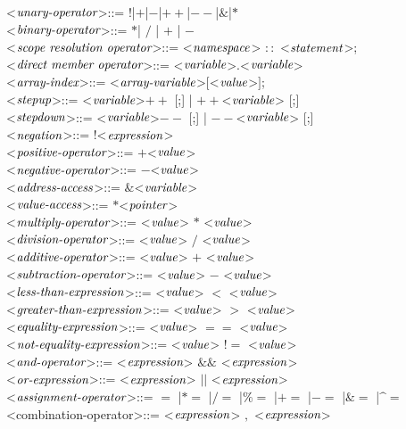 \documentclass[11pt, a4paper, UTF8]{ctexart}
\begin{document}
\begin{solution}
<$\emph{unary-operator}$>::=  $\boldsymbol{!}$|$\boldsymbol{+}$|$\boldsymbol{-}$|$\boldsymbol{++}$|$\boldsymbol{--}$|$\boldsymbol{\&}$|$\boldsymbol{*}$\\
<$\emph{binary-operator}$>::=  $\boldsymbol{*}$| $\boldsymbol{/}$ | $\boldsymbol{+}$ | $\boldsymbol{-}$ \\
<$\emph{scope resolution operator}$>::=  <$\emph{namespace}$> $\boldsymbol{::}$ <$\emph{statement}$>;\\
<$\emph{direct member operator}$>::=  <$\emph{variable}$>$\boldsymbol{.}$<$\emph{variable}$>\\
<$\emph{array-index}$>::=  <$\emph{array-variable}$>$\boldsymbol{[}$<$\emph{value}$>$\boldsymbol{]}$;\\
<$\emph{stepup}$>::=  <$\emph{variable}$>$\boldsymbol{++}$ [;] | $\boldsymbol{++}$<$\emph{variable}$> [;]\\
<$\emph{stepdown}$>::=  <$\emph{variable}$>$\boldsymbol{--}$ [;] | $\boldsymbol{--}$<$\emph{variable}$> [;]\\
<$\emph{negation}$>::=  $\boldsymbol{!}$<$\emph{expression}$>\\
<$\emph{positive-operator}$>::=  $\boldsymbol{+}$<$\emph{value}$>\\
<$\emph{negative-operator}$>::=  $\boldsymbol{-}$<$\emph{value}$>\\
<$\emph{address-access}$>::=  $\boldsymbol{\&}$<$\emph{variable}$>\\
<$\emph{value-access}$>::=  $\boldsymbol{*}$<$\emph{pointer}$>\\
<$\emph{multiply-operator}$>::=  <$\emph{value}$> $\boldsymbol{*}$ <$\emph{value}$>\\
<$\emph{division-operator}$>::=  <$\emph{value}$> $\boldsymbol{/}$ <$\emph{value}$>\\
<$\emph{additive-operator}$>::=  <$\emph{value}$> $\boldsymbol{+}$ <$\emph{value}$>\\
<$\emph{subtraction-operator}$>::=  <$\emph{value}$> $\boldsymbol{-}$ <$\emph{value}$>\\
<$\emph{less-than-expression}$>::=  <$\emph{value}$> $\boldsymbol{<}$ <$\emph{value}$>\\
<$\emph{greater-than-expression}$>::=  <$\emph{value}$> $\boldsymbol{>}$ <$\emph{value}$>\\
<$\emph{equality-expression}$>::=  <$\emph{value}$> $\boldsymbol{==}$ <$\emph{value}$>\\
<$\emph{not-equality-expression}$>::=  <$\emph{value}$> $\boldsymbol{!=}$ <$\emph{value}$>\\
<$\emph{and-operator}$>::=  <$\emph{expression}$> $\boldsymbol{\&\&}$ <$\emph{expression}$>\\
<$\emph{or-expression}$>::=  <$\emph{expression}$> $\boldsymbol{||}$ <$\emph{expression}$>\\
<$\emph{assignment-operator}$>::=  $\boldsymbol{=}$ |$\boldsymbol{*=}$ |$\boldsymbol{/=}$ |$\boldsymbol{\%=}$ |$\boldsymbol{+=}$ |$\boldsymbol{-=}$ |$\boldsymbol{\&=}$ |$\boldsymbol{\^=}$ \\
<combination-operator>::=  <$\emph{expression}$> $\boldsymbol{,}$ <$\emph{expression}$>\\ 


\end{solution}
\end{document}
